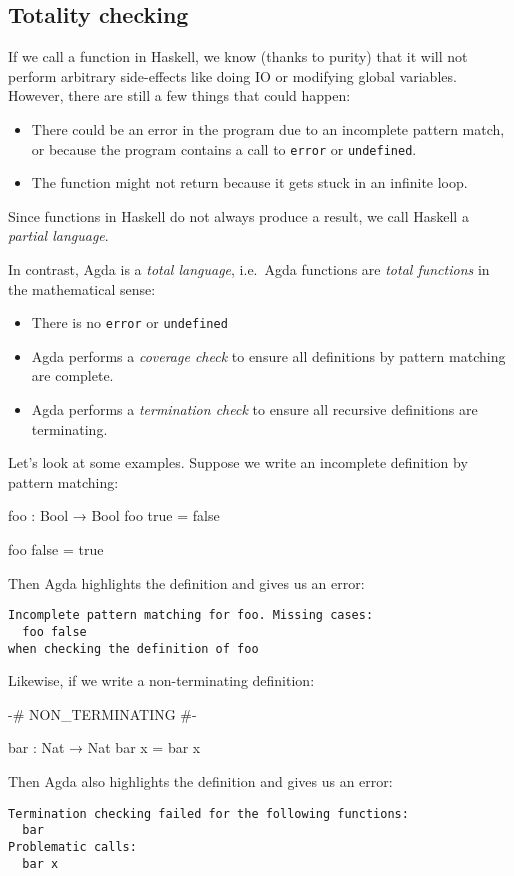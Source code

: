 \documentclass[a4paper,UKenglish]{tufte-handout}
\theoremstyle{definition}
\begin{document}
\subsection{Totality checking}

If we call a function in Haskell, we know (thanks to purity) that it will not
perform arbitrary side-effects like doing IO or modifying global variables.
However, there are still a few things that could happen:
\begin{itemize}
\item There could be an error in the program due to an incomplete pattern
match, or because the program contains a call to \texttt{error} or
\texttt{undefined}.
\item The function might not return because it gets stuck in an infinite loop.
\end{itemize}
Since functions in Haskell do not always produce a result, we call Haskell a
\emph{partial language}.

In contrast, Agda is a \emph{total language}, i.e.~Agda functions are
\emph{total functions} in the mathematical sense:
\begin{itemize}
\item There is no \texttt{error} or \texttt{undefined}
\item Agda performs a \emph{coverage check} to ensure all definitions by pattern matching are complete.
\item Agda performs a \emph{termination check} to ensure all recursive definitions are terminating.
\end{itemize}
Let's look at some examples. Suppose we write an incomplete definition by
pattern matching:
\begin{code}[number]
foo : Bool → Bool
foo true = false
\end{code}
\begin{code}[hide]
foo false = true
\end{code}
Then Agda highlights the definition and gives us an error:
\begin{verbatim}
Incomplete pattern matching for foo. Missing cases:
  foo false
when checking the definition of foo
\end{verbatim}

Likewise, if we write a non-terminating definition:
\begin{code}[hide]
{-# NON_TERMINATING #-}
\end{code}
\begin{code}[number]
bar : Nat → Nat
bar x = bar x
\end{code}
Then Agda also highlights the definition and gives us an error:
\begin{verbatim}
Termination checking failed for the following functions:
  bar
Problematic calls:
  bar x
\end{verbatim}
\end{document}
